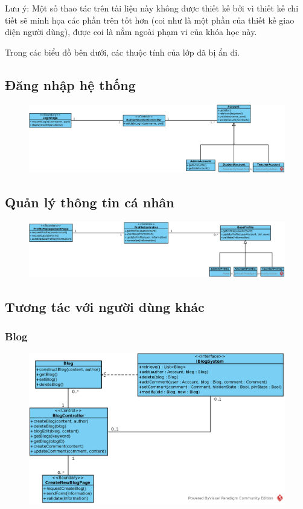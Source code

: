 \documentclass[./../main_file.tex]{subfiles}
\begin{document}
Lưu ý: Một số thao tác trên tài liệu này không được thiết kế bởi vì thiết kế chi tiết sẽ  minh họa các phần trên tốt hơn (coi như là một phần của thiết kế giao diện người dùng), được coi là nằm ngoài phạm vi của khóa học này.

Trong các biểu đồ bên dưới, các thuộc tính của lớp đã bị ẩn đi.

\subsection{Đăng nhập hệ thống}
\begin{figure}[H]
	\centering
	\includegraphics[width=\linewidth]{./images/define_operations/ucd_method_ss_login.eps}
\end{figure}
\subsection{Quản lý thông tin cá nhân}
\begin{figure}[H]
	\centering
	\includegraphics[width=\linewidth]{./images/define_operations/ucd_method_ss_profile.eps}
\end{figure}
\subsection{Tương tác với người dùng khác}
\subsubsection{Blog}
\begin{figure}[H]
	\centering
	\includegraphics[width=\linewidth]{./images/define_operations/ucd_method_ss_blog.eps}
\end{figure}
\end{document}
